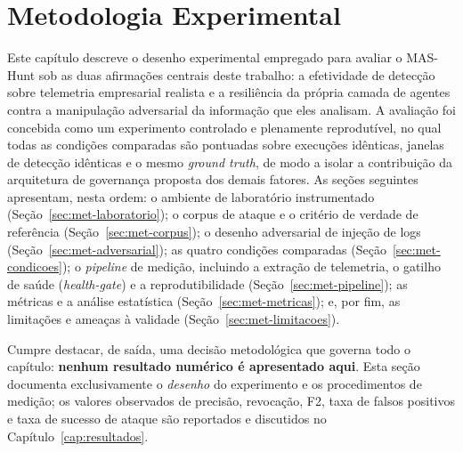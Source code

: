 
\chapter{Metodologia Experimental}
\label{cap:metodologia}

Este capítulo descreve o desenho experimental empregado para avaliar o
MAS-Hunt sob as duas afirmações centrais deste trabalho: a efetividade de
detecção sobre telemetria empresarial realista e a resiliência da própria
camada de agentes contra a manipulação adversarial da informação que eles
analisam. A avaliação foi concebida como um experimento controlado e
plenamente reprodutível, no qual todas as condições comparadas são pontuadas
sobre execuções idênticas, janelas de detecção idênticas e o mesmo
\textit{ground truth}, de modo a isolar a contribuição da arquitetura de
governança proposta dos demais fatores. As seções seguintes apresentam, nesta
ordem: o ambiente de laboratório instrumentado
(Seção~\ref{sec:met-laboratorio}); o corpus de ataque e o critério de verdade
de referência (Seção~\ref{sec:met-corpus}); o desenho adversarial de injeção de
logs (Seção~\ref{sec:met-adversarial}); as quatro condições comparadas
(Seção~\ref{sec:met-condicoes}); o \textit{pipeline} de medição, incluindo a
extração de telemetria, o gatilho de saúde (\textit{health-gate}) e a
reprodutibilidade (Seção~\ref{sec:met-pipeline}); as métricas e a análise
estatística (Seção~\ref{sec:met-metricas}); e, por fim, as limitações e ameaças
à validade (Seção~\ref{sec:met-limitacoes}).

Cumpre destacar, de saída, uma decisão metodológica que governa todo o
capítulo: \textbf{nenhum resultado numérico é apresentado aqui}. Esta seção
documenta exclusivamente o \emph{desenho} do experimento e os procedimentos de
medição; os valores observados de precisão, revocação, F2, taxa de falsos
positivos e taxa de sucesso de ataque são reportados e discutidos no
Capítulo~\ref{cap:resultados}.

